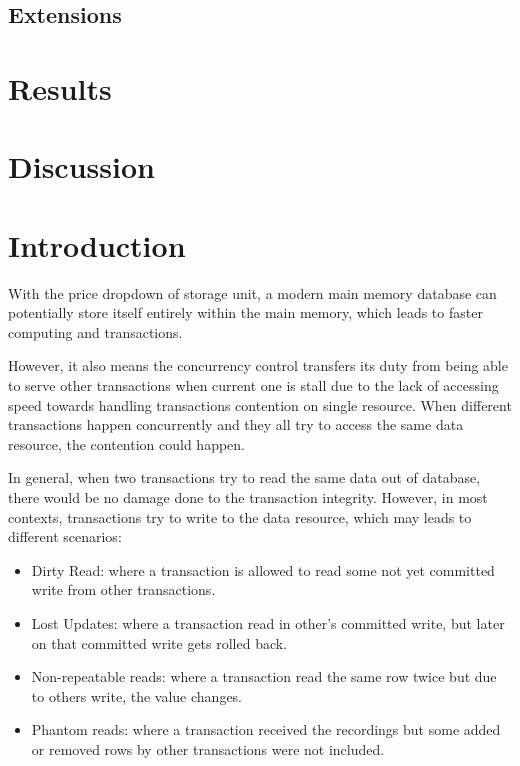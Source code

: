 \subsection{Extensions}

\section{Results}
\section{Discussion}







\newpage
\section{Introduction}

With the price dropdown of storage unit, a modern main memory database can potentially store itself entirely within the main memory, which leads to faster computing and transactions\cite{garcia1992main}.

However, it also means the concurrency control transfers its duty from being able to serve other transactions when current one is stall due to the lack of accessing speed towards handling transactions contention on single resource. When different transactions happen concurrently and they all try to access the same data resource, the contention could happen.

In general, when two transactions try to read the same data out of database, there would be no damage done to the transaction integrity\cite{gray1992transaction}. However, in most contexts, transactions try to write to the data resource, which may leads to different scenarios:
\begin{itemize}
\item Dirty Read: where a transaction is allowed to read some not yet committed write from other transactions.

\item Lost Updates: where a transaction read in other's committed write, but later on that committed write gets rolled back.

\item Non-repeatable reads: where a transaction read the same row twice but due to others write, the value changes.

\item Phantom reads: where a transaction received the recordings but some added or removed rows by other transactions were not included.
\end{itemize}


